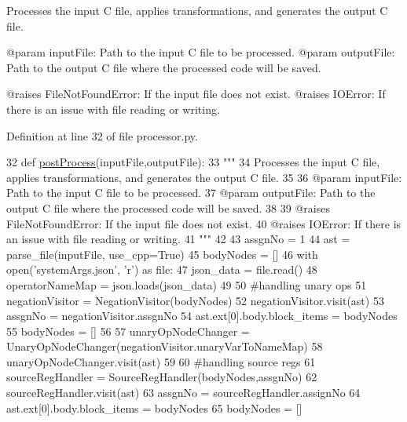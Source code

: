 \begin{DoxyVerb}Processes the input C file, applies transformations, and generates the output C file.

@param inputFile: Path to the input C file to be processed.
@param outputFile: Path to the output C file where the processed code will be saved.

@raises FileNotFoundError: If the input file does not exist.
@raises IOError: If there is an issue with file reading or writing.
\end{DoxyVerb}
 

Definition at line 32 of file processor.\+py.


\begin{DoxyCode}
32 \textcolor{keyword}{def }\hyperlink{namespacePostProcessor_1_1processor_a3f18e4947e2313a8b23367f06f4b02c2}{postProcess}(inputFile,outputFile):
33     \textcolor{stringliteral}{"""
}
34 \textcolor{stringliteral}{    Processes the input C file, applies transformations, and generates the output C file.
}
35 \textcolor{stringliteral}{
}
36 \textcolor{stringliteral}{    @param inputFile: Path to the input C file to be processed.
}
37 \textcolor{stringliteral}{    @param outputFile: Path to the output C file where the processed code will be saved.
}
38 \textcolor{stringliteral}{
}
39 \textcolor{stringliteral}{    @raises FileNotFoundError: If the input file does not exist.
}
40 \textcolor{stringliteral}{    @raises IOError: If there is an issue with file reading or writing.
}
41 \textcolor{stringliteral}{    """}
42 
43     assgnNo = 1
44     ast = parse\_file(inputFile, use\_cpp=\textcolor{keyword}{True})
45     bodyNodes = []
46     with open(\textcolor{stringliteral}{'systemArgs.json'}, \textcolor{stringliteral}{'r') as file:
}
47 \textcolor{stringliteral}{        json\_data = file.read()
}
48 \textcolor{stringliteral}{    operatorNameMap = json.loads(json\_data)
}
49 \textcolor{stringliteral}{
}
50 \textcolor{stringliteral}{}\textcolor{comment}{#handling unary ops
}
51     negationVisitor = NegationVisitor(bodyNodes)
52     negationVisitor.visit(ast)
53     assgnNo = negationVisitor.assgnNo
54     ast.ext[0].body.block\_items = bodyNodes
55     bodyNodes = []
56 
57     unaryOpNodeChanger = UnaryOpNodeChanger(negationVisitor.unaryVarToNameMap)
58     unaryOpNodeChanger.visit(ast)
59 
60 \textcolor{comment}{#handling source regs
}
61     sourceRegHandler = SourceRegHandler(bodyNodes,assgnNo)
62     sourceRegHandler.visit(ast)
63     assgnNo = sourceRegHandler.assignNo
64     ast.ext[0].body.block\_items = bodyNodes
65     bodyNodes = []

\end{DoxyCode}
